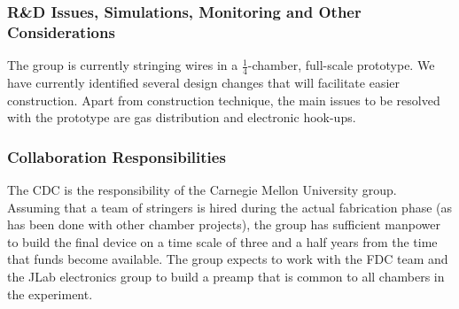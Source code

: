 \subsubsection*{R\&D Issues, Simulations, Monitoring and Other Considerations}

The group is currently stringing wires in a $\frac{1}{4}$-chamber, full-scale 
prototype. We have currently identified several design changes that will
facilitate easier construction. Apart from construction technique, the main
 issues to be resolved with the prototype are gas distribution and electronic
hook-ups.  


\subsubsection*{Collaboration Responsibilities}

The CDC is the responsibility of the Carnegie Mellon University group. Assuming that
a team of stringers is hired during the actual fabrication phase (as has been
done with other chamber projects), the group has sufficient manpower to build the
final device on a time scale of three and a half years from the time that funds
become available. The group expects to work with the FDC team and the JLab electronics
group to build a preamp that is common to all chambers in the experiment.  

